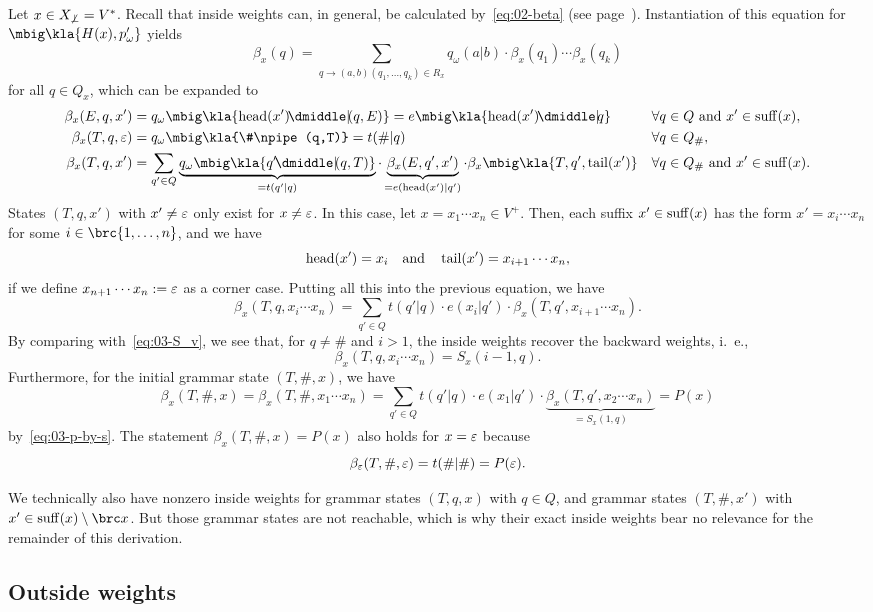 Let $x\in X_{\not\bot}=V^*$. Recall that inside weights can, in general, be
calculated by~\eqref{eq:02-beta} (see page~\pageref{eq:02-beta}).
Instantiation of this equation for $\mbig\kla{H(x),p_\omega'}$ yields
\[
 \beta_x(q) = \sum_{q\to(a,b)(q_1,\ldots,q_k)\in R_x} q_\omega(a|b) \cdot \beta_x(q_1) \cdots \beta_x(q_k)
\]
for all $q\in Q_x$, which can be expanded to
\begin{align*}
 \beta_x(E,q,x') &= q_\omega\mbig\kla{\car(x')\npipe(q,E)} = e\mbig\kla{\car(x')\npipe q}
 && \forall q\in Q \text{ and } x'\in\suff(x), \\
 \beta_x(T,q,\eps) &= q_\omega\mbig\kla{\#\npipe(q,T)} = t(\#|q)
 && \forall q\in Q_\#, \\
 \beta_x(T,q,x') &= \sum_{q'\in Q} \underbrace{q_\omega\mbig\kla{q'\npipe(q,T)}}_{=t(q'|q)} \cdot \underbrace{\beta_x(E,q',x')}_{=e(\car(x')|q')} \cdot \beta_x\mbig\kla{T,q',\cdr(x')}
 && \forall q\in Q_\# \text{ and } x'\in\suff(x).
\end{align*}
States $(T,q,x')$ with $x'\neq\varepsilon$ only exist for $x\neq\varepsilon$. In this
case, let $x=x_1\cdots x_n\in V^+$. Then, each suffix $x'\in\operatorname{suff}(x)$ has the
form $x' = x_i\cdots x_n$ for some $i\in\brc{1,\ldots,n}$, and we have
\[
 \operatorname{head}(x') = x_i
 \quad\text{and}\quad
 \operatorname{tail}(x') = x_{i+1} \cdots x_n,
\]
if we define $x_{n+1}\cdots x_n := \varepsilon$ as a corner case. Putting all this into
the previous equation, we have
\[
 \beta_x(T,q,x_i\cdots x_n) = \sum_{q'\in Q} t(q'|q) \cdot e(x_i|q') \cdot \beta_x(T,q',x_{i+1}\cdots x_n).
\]
By comparing with~\eqref{eq:03-S_v}, we see that, for $q\neq\#$ and $i>1$, the inside weights recover the backward weights, i.~e.,
\[
 \beta_x(T,q,x_i\cdots x_n) = S_x(i-1,q).
\]
Furthermore, for the initial grammar state $(T,\#,x)$, we have
\[
 \beta_x(T,\#,x) = \beta_x(T,\#,x_1\cdots x_n) = \sum_{q'\in Q} t(q'|q) \cdot e(x_1|q') \cdot \underbrace{\beta_x(T,q',x_2\cdots x_n)}_{=S_x(1,q)} = P(x)
\]
by~\eqref{eq:03-p-by-s}. The statement $\beta_x(T,\#,x) = P(x)$ also holds for $x=\varepsilon$ because
\label{eq:03-beta-eps}\[
 \beta_\varepsilon(T,\#,\varepsilon) = t(\#|\#) = P(\varepsilon).
\]

We technically also have nonzero inside weights for grammar states $(T,q,x)$
with $q\in Q$, and grammar states $(T,\#,x')$ with $x'\in\suff(x)\setminus\brc
x$. But those grammar states are not reachable, which is why their exact inside
weights bear no relevance for the remainder of this derivation.

\subsection{Outside weights}

